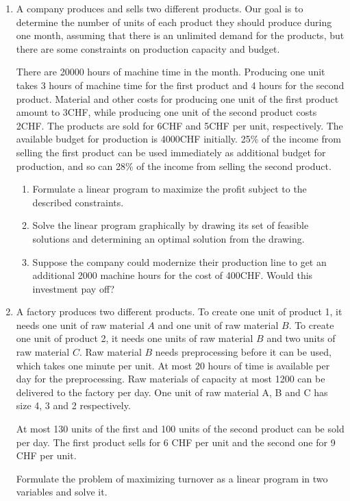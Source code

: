 \begin{enumerate}[1)]
\item A company produces and sells two different products.
Our goal is to determine the number of units of each product they should produce during one month,
assuming that there is an unlimited demand for the products,
but there are some constraints on production capacity and budget.

There are 20000 hours of machine time in the month.
Producing one unit takes 3 hours of machine time for the first product and 4 hours for the second product.
Material and other costs for producing one unit of the first product amount to 3CHF,
while producing one unit of the second product costs 2CHF.
The products are sold for 6CHF and 5CHF per unit, respectively.
The available budget for production is 4000CHF initially.
25\% of the income from selling the first product can be used immediately as additional budget for production,
and so can 28\% of the income from selling the second product.
\begin{enumerate}
\item Formulate a linear program to maximize the profit subject to the described constraints.
\item Solve the linear program graphically by drawing its set of feasible solutions and determining an optimal solution from the drawing.
\item Suppose the company could modernize their production line to get an additional 2000 machine hours for the cost of 400CHF.
  Would this investment pay off?
\end{enumerate}

\item A factory produces two different products.
To create one unit of product 1, it needs one unit of raw material $A$
and one unit of raw material $B$.
To create one unit of product 2, it needs one units of raw material $B$ and
two units of raw material $C$.
Raw material $B$ needs preprocessing before it can be used, which takes
one minute per unit. 
At most 20 hours of time is available per day for the preprocessing.
Raw materials of capacity at most 1200 can be delivered to the factory per day. 
One unit of raw material A, B and C has size 4, 3 and 2 respectively. 

At most 130 units of the first and 100 units of the second product can be sold
per day. The first product sells for 6 CHF per unit and the second one
for 9 CHF per unit.

Formulate the problem of maximizing turnover as a linear program in two variables and solve it.


\end{enumerate}
